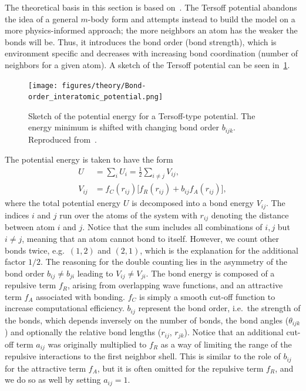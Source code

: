 

The theoretical basis in this section is based
on~\cite{docs_lammps_tersoff,PhysRevB.37.6991}. The Tersoff potential abandons
the idea of a general $m$-body form and attempts instead to build the model on a
more physics-informed approach; the more neighbors an atom has the weaker the
bonds will be. Thus, it introduces the bond order (bond strength), which is
environment specific and decreases with increasing bond coordination (number of
neighbors for a given atom). A sketch of the Tersoff potential can be seen
in~\cref{fig:bond_order}. 


\begin{figure}[!htb]
  \centering
  \texttt{[image: figures/theory/Bond-order\_interatomic\_potential.png]}
  \caption{Sketch of the potential energy for a Tersoff-type potential. The energy minimum is shifted with changing bond order $b_{ijk}$. Reproduced from~\cite{wiki:bond_order}.}
  \label{fig:bond_order}
\end{figure}


The potential energy is taken to have the form
\begin{align*}
  U &= \sum_i U_i = \frac{1}{2}\sum_{i \ne j} V_{ij}, \\
  V_{ij} &= f_C(r_{ij}) \big[f_R(r_{ij}) + b_{ij}f_A(r_{ij})  \big],
\end{align*}
where the total potential energy $U$ is decomposed into a bond energy $V_{ij}$.
The indices $i$ and $j$ run over the atoms of the system with $r_{ij}$ denoting
the distance between atom $i$ and $j$. Notice that the sum includes all
combinations of $i,j$ but $i\ne j$, meaning that an atom cannot bond to itself.
However, we count other bonds twice, e.g.\ $(1,2)$ and $(2,1)$, which is the
explanation for the additional factor $1/2$. The reasoning for the double
counting lies in the asymmetry of the bond order $b_{ij}\ne b_{ji}$ leading to
$V_{ij}\ne V_{ji}$. The bond energy is composed of a repulsive term $f_R$,
arising from overlapping wave functions, and an attractive term $f_A$ associated
with bonding. $f_C$ is simply a smooth cut-off function to increase
computational efficiency. $b_{ij}$ represent the bond order, i.e.\ the strength
of the bonds, which depends inversely on the number of bonds, the bond angles
($\theta_{ijk}$) and optionally the relative bond lengths ($r_{ij}$, $r_{jk}$).
Notice that an additional cut-off term $a_{ij}$ was originally multiplied to
$f_R$ as a way of limiting the range of the repulsive interactions to
the first neighbor shell. This is similar to the role of $b_{ij}$ for the attractive term $f_A$, but it is often omitted for the repulsive
term $f_R$, and we do so as well by setting $a_{ij} = 1$. 

